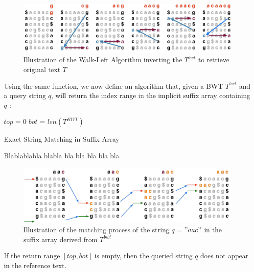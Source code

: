 \begin{figure}[H]
\centering
\includegraphics[scale = 0.4]{Figures/WL_algo.png}
\caption{Illustration of the Walk-Left Algorithm inverting the $T^{bwt}$ to retrieve original text $T$}
\label{fig:walkleft}
\end{figure}

Using the same function, we now define an algorithm that, given a BWT $T^{bwt}$ and a query string $q$, will return the index range in the implicit suffix array containing $q$ : \\

\begin{minipage}[t]{0.55\textwidth}
\begin{algorithm}[H]
\SetAlgoLined
{}
	$top$ = 0\;
	$bot$ = $len(T^{BWT})$\;
\caption{Exact String Matching in Suffix Array}
\end{algorithm}
\end{minipage}
\hspace{3mm}
\begin{minipage}[t]{0.3\textwidth}
Blablablabla blabla bla bla bla bla bla
\end{minipage}

\begin{figure}[H]
\centering
\includegraphics[scale = 0.35]{Figures/matching_algo.png}
\caption{Illustration of the matching process of the string  $q$ = $"aac"$ in the suffix array derived from $T^{bwt}$ }
\end{figure}


If the return range $[top, bot]$ is empty, then the queried string $q$ does not appear in the reference text.


